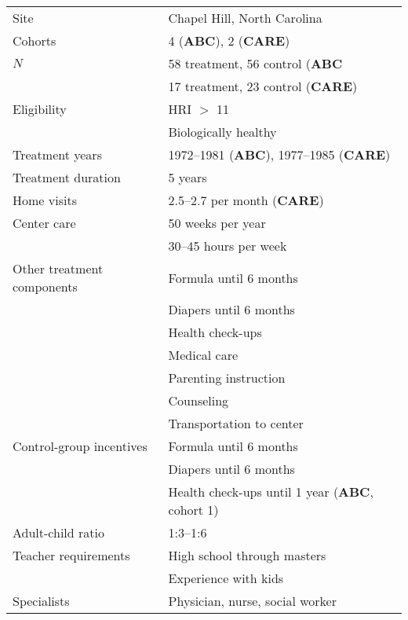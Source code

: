 \begin{tabular}{l l}
	\toprule
Site & Chapel Hill, North Carolina \\
Cohorts & 4 (\textbf{ABC}), 2 (\textbf{CARE}) \\
$N$ & 58 treatment, 56 control (\textbf{ABC} \\
	& 17 treatment, 23 control (\textbf{CARE}) \\
\midrule
Eligibility & HRI $>$ 11 \\
		& Biologically healthy \\
\midrule
Treatment years & 1972--1981 (\textbf{ABC}), 1977--1985 (\textbf{CARE}) \\
Treatment duration & 5 years \\
\midrule
Home visits 	& 2.5--2.7	per month (\textbf{CARE})	\\
Center care	& 50	weeks per year \\
		 	& 30--45 hours per week  \\
Other treatment components & Formula until 6 months\\
					& Diapers until 6 months \\ 
					& Health check-ups \\
					& Medical care \\
					& Parenting instruction \\
					& Counseling \\
					& Transportation to center \\
Control-group incentives & Formula until 6 months \\
				& Diapers until 6 months 	\\
				& Health check-ups until 1 year (\textbf{ABC}, cohort 1) \\
\midrule
Adult-child ratio & 1:3--1:6 \\
Teacher requirements & High school through masters \\
				& Experience with kids \\
Specialists & Physician, nurse, social worker \\
\bottomrule
\end{tabular}


